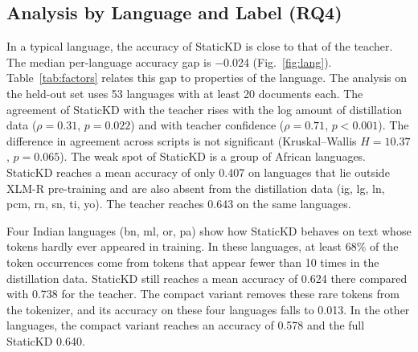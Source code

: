 \documentclass[journal]{IEEEtran}
\begin{document}
\subsection{Analysis by Language and Label (RQ4)}
\label{sec:res-lang}
\begin{table}[!t]
\caption{Factors Behind Per-Language Performance}
\label{tab:factors}
\centering
\footnotesize
\setlength{\tabcolsep}{3pt}
\end{table}
In a typical language, the accuracy of StaticKD is close to that of the teacher. The median per-language accuracy gap is $-$0.024 (Fig.~\ref{fig:lang}). Table~\ref{tab:factors} relates this gap to properties of the language. The analysis on the held-out set uses 53 languages with at least 20 documents each. The agreement of StaticKD with the teacher rises with the log amount of distillation data ($\rho=0.31$, $p=0.022$) and with teacher confidence ($\rho=0.71$, $p<0.001$). The difference in agreement across scripts is not significant (Kruskal--Wallis $H=10.37$, $p=0.065$). The weak spot of StaticKD is a group of African languages. StaticKD reaches a mean accuracy of only 0.407 on languages that lie outside XLM-R pre-training and are also absent from the distillation data (ig, lg, ln, pcm, rn, sn, ti, yo). The teacher reaches 0.643 on the same languages.

Four Indian languages (bn, ml, or, pa) show how StaticKD behaves on text whose tokens hardly ever appeared in training. In these languages, at least 68\% of the token occurrences come from tokens that appear fewer than 10 times in the distillation data. StaticKD still reaches a mean accuracy of 0.624 there compared with 0.738 for the teacher. The compact variant removes these rare tokens from the tokenizer, and its accuracy on these four languages falls to 0.013. In the other languages, the compact variant reaches an accuracy of 0.578 and the full StaticKD 0.640.
\end{document}
